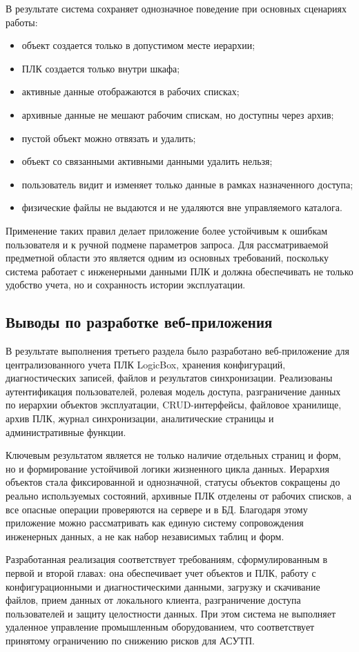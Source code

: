 В результате система сохраняет однозначное поведение при основных сценариях работы:
\begin{itemize}
    \item объект создается только в допустимом месте иерархии;
    \item ПЛК создается только внутри шкафа;
    \item активные данные отображаются в рабочих списках;
    \item архивные данные не мешают рабочим спискам, но доступны через архив;
    \item пустой объект можно отвязать и удалить;
    \item объект со связанными активными данными удалить нельзя;
    \item пользователь видит и изменяет только данные в рамках назначенного доступа;
    \item физические файлы не выдаются и не удаляются вне управляемого каталога.
\end{itemize}

Применение таких правил делает приложение более устойчивым к ошибкам пользователя и к ручной подмене параметров запроса. Для рассматриваемой предметной области это является одним из основных требований, поскольку система работает с инженерными данными ПЛК и должна обеспечивать не только удобство учета, но и сохранность истории эксплуатации.


\subsection{Выводы по разработке веб-приложения}

В результате выполнения третьего раздела было разработано веб-приложение для централизованного учета ПЛК LogicBox, хранения конфигураций, диагностических записей, файлов и результатов синхронизации. Реализованы аутентификация пользователей, ролевая модель доступа, разграничение данных по иерархии объектов эксплуатации, CRUD-интерфейсы, файловое хранилище, архив ПЛК, журнал синхронизации, аналитические страницы и административные функции.

Ключевым результатом является не только наличие отдельных страниц и форм, но и формирование устойчивой логики жизненного цикла данных. Иерархия объектов стала фиксированной и однозначной, статусы объектов сокращены до реально используемых состояний, архивные ПЛК отделены от рабочих списков, а все опасные операции проверяются на сервере и в БД. Благодаря этому приложение можно рассматривать как единую систему сопровождения инженерных данных, а не как набор независимых таблиц и форм.

Разработанная реализация соответствует требованиям, сформулированным в первой и второй главах: она обеспечивает учет объектов и ПЛК, работу с конфигурационными и диагностическими данными, загрузку и скачивание файлов, прием данных от локального клиента, разграничение доступа пользователей и защиту целостности данных. При этом система не выполняет удаленное управление промышленным оборудованием, что соответствует принятому ограничению по снижению рисков для АСУТП.
